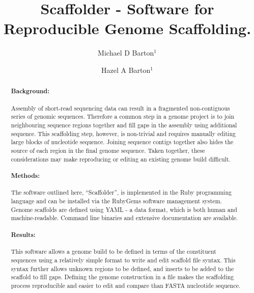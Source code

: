 \documentclass[10pt]{bmc_article}
\newenvironment{bmcformat}{\begin{raggedright}\baselineskip20pt\sloppy\setboolean{publ}{false}}{\end{raggedright}\baselineskip20pt\sloppy}
\begin{document}
\begin{bmcformat}

\title{Scaffolder - Software for Reproducible Genome Scaffolding.} %

\author{
  Michael D Barton$^{1}$\correspondingauthor%
\and
  Hazel A Barton$^1$%
      }

\address{\iid(1) Department of Biological Sciences, Northern Kentucky %
University, Nunn Drive, Highland Heights, KY 41076 }%

\maketitle

\clearpage

\begin{abstract} %

  \paragraph*{Background:} Assembly of short-read sequencing data can result in
  a fragmented non-contiguous series of genomic sequences. Therefore a common
  step in a genome project is to join neighbouring sequence regions together
  and fill gaps in the assembly using additional sequence. This scaffolding
  step, however, is non-trivial and requires manually editing large blocks of
  nucleotide sequence. Joining sequence contigs together also hides the source
  of each region in the final genome sequence. Taken together, these
  considerations may make reproducing or editing an existing genome build
  difficult.

  \paragraph*{Methods:} The software outlined here, ``Scaffolder'', is
  implemented in the Ruby programming language and can be installed via the
  RubyGems software management system. Genome scaffolds are defined using YAML
  - a data format, which is both human and machine-readable. Command line
  binaries and extensive documentation are available.

  \paragraph*{Results:} This software allows a genome build to be defined in
  terms of the constituent sequences using a relatively simple format to write
  and edit scaffold file syntax. This syntax further allows  unknown regions to
  be defined, and inserts to be added to the scaffold to fill gaps. Defining
  the genome construction in a file makes the scaffolding process reproducible
  and easier to edit and compare than FASTA nucleotide sequence.


\end{abstract}
\end{bmcformat}
\end{document}
